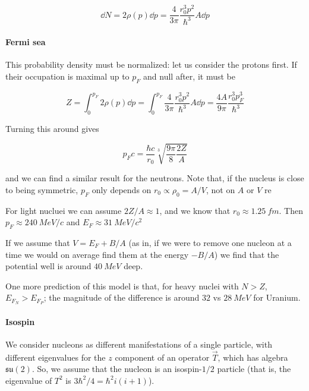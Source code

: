 \documentclass{article}
\begin{document}
\begin{equation} \label{eq:fermi-state-density}
    \dd{N} = 2 \rho(p) \dd{p} = \frac{4}{3 \pi} \frac{r_0^3 p^2}{\hbar^3} A \dd{p}
\end{equation}

\paragraph{Fermi sea}

This probability density must be normalized: let us consider the protons first. If their occupation is maximal up to \(p_F\) and null after, it must be

\begin{equation}
    Z
    = \int _{0}  ^{p_F} 2 \rho( p)  \dd{p}
    = \int _{0}  ^{p_F} \frac{4}{3 \pi} \frac{r_0^3 p^2}{\hbar^3} A \dd{p}
    = \frac{4 A}{9 \pi} \frac{r_0^3 p_F^3}{\hbar^3}
\end{equation}

Turning this around gives

\begin{equation} \label{eq:fermi-sea-momentum-protons}
    p_F c = \frac{\hbar c}{r_0} \sqrt[3]{\frac{9 \pi }{8} \frac{2Z}{A}}
\end{equation}

and we can find a similar result for the neutrons.
Note that, if the nucleus is close to being symmetric, \(p_F\) only depends on \(r_0 \propto \rho_0 = A/V\), not on \(A\) or \(V\) re

For light nucluei we can assume \(2Z/A \approx 1\), and we know that \(r_0 \approx \SI{1.25}{fm} \). Then \(p_F \approx \SI{240}{MeV/c} \) and \(E_F \approx \SI{31}{MeV/c^2} \)

If we assume that \(V = E_F + B/A\) (as in, if we were to remove one nucleon at a time we would on average find them at the energy \(-B/A\)) we find that the potential well is around \(\SI{40}{MeV}\) deep.

One more prediction of this model is that, for heavy nuclei with \(N>Z\), \(E_{F_N} > E_{F_P}\); the magnitude of the difference is around \(32\) vs \(\SI{28}{MeV} \) for Uranium.

\paragraph{Isospin}

We consider nucleons as different manifestations of a single particle, with different eigenvalues for the \(z\) component of an operator \(\vec{T} \), which has algebra \(\mathfrak{su}(2)\). So, we assume that the nucleon is an isospin-\(1/2\) particle (that is, the eigenvalue of \(T^2\) is \(3\hbar^2 /4 = \hbar^2 i (i+1)\)).
\end{document}

